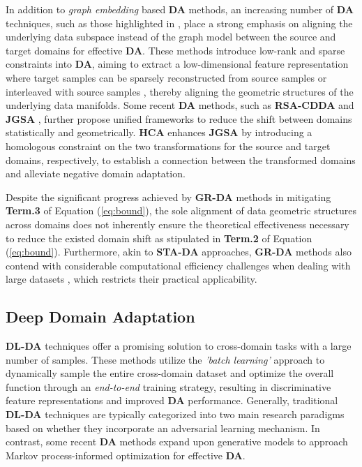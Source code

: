 In addition to \textit{graph embedding} based \textbf{DA} methods, an increasing number of \textbf{DA} techniques, such as those highlighted in \cite{DBLP:journals/corr/LuoWHC17,DBLP:journals/ijcv/ShaoKF14,DBLP:journals/tip/XuFWLZ16,sun2016return,DBLP:journals/tnn/DingF18,DBLP:conf/iccv/FernandoHST13}, place a strong emphasis on aligning the underlying data subspace instead of the graph model between the source and target domains for effective \textbf{DA}. These methods introduce low-rank and sparse constraints into \textbf{DA}, aiming to extract a low-dimensional feature representation where target samples can be sparsely reconstructed from source samples \cite{DBLP:journals/ijcv/ShaoKF14} or interleaved with source samples \cite{DBLP:journals/tip/XuFWLZ16}, thereby aligning the geometric structures of the underlying data manifolds. Some recent \textbf{DA} methods, such as \textbf{RSA-CDDA} \cite{DBLP:journals/corr/LuoWHC17} and \textbf{JGSA} \cite{Zhang_2017_CVPR}, further propose unified frameworks to reduce the shift between domains statistically and geometrically. \textbf{HCA} \cite{liu2019homologous} enhances \textbf{JGSA} by introducing a homologous constraint on the two transformations for the source and target domains, respectively, to establish a connection between the transformed domains and alleviate negative domain adaptation. 







Despite the significant progress achieved by \textbf{GR-DA} methods in mitigating \textbf{Term.3} of Equation (\ref{eq:bound}), the sole alignment of data geometric structures across domains does not inherently ensure the theoretical effectiveness necessary to reduce the existed domain shift as stipulated in \textbf{Term.2} of Equation (\ref{eq:bound}). Furthermore, akin to \textbf{STA-DA} approaches, \textbf{GR-DA} methods also contend with considerable computational efficiency challenges when dealing with large datasets \cite{peng2019moment}, which restricts their practical applicability.



\subsection{Deep Domain Adaptation}
\label{subsect: Deep DA}



\textbf{DL-DA} techniques offer a promising solution to cross-domain tasks with a large number of samples. These methods utilize the \textit{'batch learning'} approach to dynamically sample the entire cross-domain dataset and optimize the overall function through an \textit{end-to-end} training strategy, resulting in discriminative feature representations and improved \textbf{DA} performance. Generally, traditional \textbf{DL-DA} techniques are typically categorized into two main research paradigms based on whether they incorporate an adversarial learning mechanism. In contrast, some recent \textbf{DA} methods expand upon generative models to approach Markov process-informed optimization for effective \textbf{DA}.


